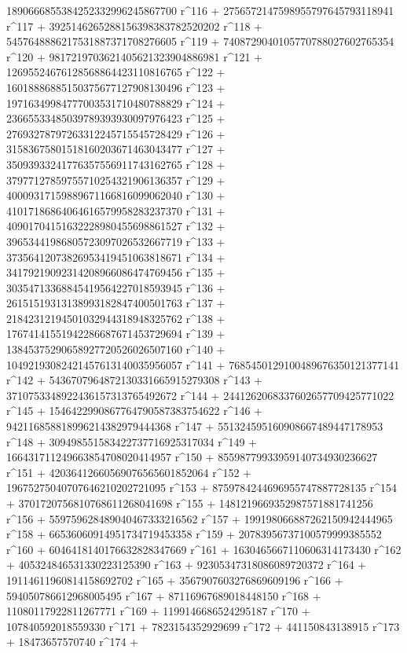        1890666855384252332996245867700 r^116 + 
       2756572147598955797645793118941 r^117 + 
       3925146265288156398383782520202 r^118 + 
       5457648886217531887371708276605 r^119 + 
       7408729040105770788027602765354 r^120 + 
       9817219703621405621323904886981 r^121 + 
       12695524676128568864423110816765 r^122 + 
       16018886885150375677127908130496 r^123 + 
       19716349984777003531710480788829 r^124 + 
       23665533485039789393930097976423 r^125 + 
       27693278797263312245715545728429 r^126 + 
       31583675801518160203671463043477 r^127 + 
       35093933241776357556911743162765 r^128 + 
       37977127859755710254321906136357 r^129 + 
       40009317159889671166816099062040 r^130 + 
       41017186864064616579958283237370 r^131 + 
       40901704151632228980455698861527 r^132 + 
       39653441986805723097026532667719 r^133 + 
       37356412073826953419451063818671 r^134 + 
       34179219092314208966086474769456 r^135 + 
       30354713368845419564227018593945 r^136 + 
       26151519313138993182847400501763 r^137 + 
       21842312194501032944318948325762 r^138 + 
       17674141551942286687671453729694 r^139 + 
       13845375290658927720526026507160 r^140 + 
       10492193082421457613140035956057 r^141 + 
       7685450129100489676350121377141 r^142 + 
       5436707964872130331665915279308 r^143 + 
       3710753348922436157313765492672 r^144 + 
       2441262068337602657709425771022 r^145 + 
       1546422990867764790587383754622 r^146 + 
       942116858818996214382979444368 r^147 + 
       551324595160908667489447178953 r^148 + 
       309498551583422737716925317034 r^149 + 
       166431711249663854708020414957 r^150 + 
       85598779933959140734930236627 r^151 + 
       42036412660569076565601852064 r^152 + 
       19675275040707646210202721095 r^153 + 
       8759784244696955747887728135 r^154 + 
       3701720756810768611268041698 r^155 + 
       1481219669352987571881741256 r^156 + 
       559759628489040467333216562 r^157 + 
       199198066887262150942444965 r^158 + 
       66536060914951734719453358 r^159 + 
       20783956737100579999385552 r^160 + 
       6046418140176632828347669 r^161 + 
       1630465667110606314173430 r^162 + 
       405324846531330223125390 r^163 + 
       92305347318086089720372 r^164 + 
       19114611960814158692702 r^165 + 3567907603276869609196 r^166 + 
       594050786612968005495 r^167 + 87116967689018448150 r^168 + 
       11080117922811267771 r^169 + 1199146686524295187 r^170 + 
       107840592018559330 r^171 + 7823154352929699 r^172 + 
       441150843138915 r^173 + 18473657570740 r^174 + 
